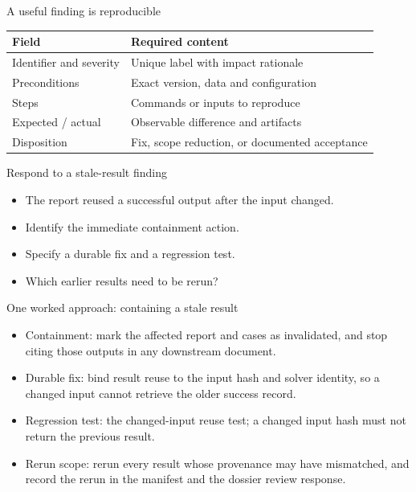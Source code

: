\documentclass[aspectratio=169,11pt]{beamer}
\begin{document}
\begin{frame}[t,fragile]{A useful finding is reproducible}
\fontsize{10.5}{12.5}\selectfont\setlength{\tabcolsep}{4pt}\renewcommand{\arraystretch}{1.15}
\begin{tabular}{>{\raggedright\arraybackslash}p{}>{\raggedright\arraybackslash}p{}}
\toprule
\textbf{Field} & \textbf{Required content} \\ \midrule
Identifier and severity & Unique label with impact rationale \\[2pt]
Preconditions & Exact version, data and configuration \\[2pt]
Steps & Commands or inputs to reproduce \\[2pt]
Expected / actual & Observable difference and artifacts \\[2pt]
Disposition & Fix, scope reduction, or documented acceptance \\[2pt]
\bottomrule\end{tabular}\par\vspace{2mm}
\end{frame}
\begin{frame}[t,fragile]{Respond to a stale-result finding}
\fontsize{11.5}{14}\selectfont
\begin{itemize}\setlength{\itemsep}{2mm}
\item The report reused a successful output after the input changed.
\item Identify the immediate containment action.
\item Specify a durable fix and a regression test.
\item Which earlier results need to be rerun?
\end{itemize}
\end{frame}
\begin{frame}[t,fragile]{One worked approach: containing a stale result}
\fontsize{11.5}{14}\selectfont
\begin{itemize}\setlength{\itemsep}{2mm}
\item Containment: mark the affected report and cases as invalidated, and stop citing those outputs in any downstream document.
\item Durable fix: bind result reuse to the input hash and solver identity, so a changed input cannot retrieve the older success record.
\item Regression test: the changed-input reuse test; a changed input hash must not return the previous result.
\item Rerun scope: rerun every result whose provenance may have mismatched, and record the rerun in the manifest and the dossier review response.
\end{itemize}
\end{frame}
\end{document}
